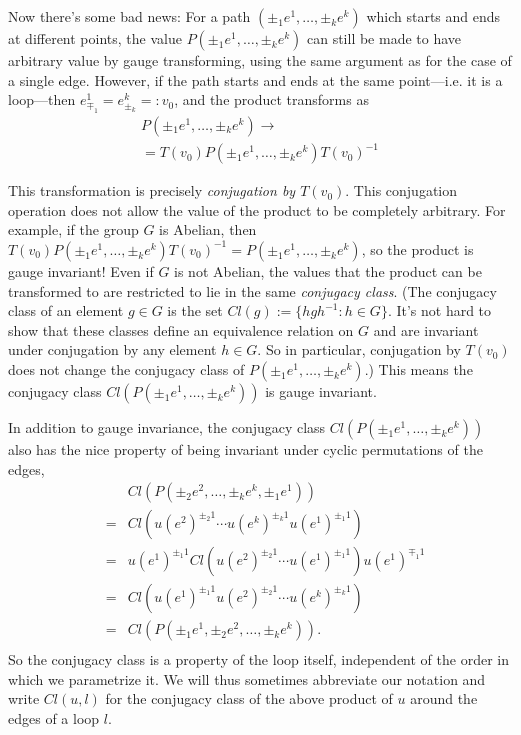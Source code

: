 \documentclass[9pt,twocolumn,twoside]{article}
\begin{document}
Now there's some bad news: For a path $(\pm_1 e^1, \dots , \pm_k e^k)$ which starts and ends at different points, the value $P(\pm_1 e^1, \dots , \pm_k e^k)$ can still be made to have arbitrary value by gauge transforming, using the same argument as for the case of a single edge.  However, if the path starts and ends at the same point---i.e. it is a loop---then $e_{\mp_1}^1 = e_{\pm_k}^k =: v_0$, and the product transforms as 
\begin{multline*}
P(\pm_1 e^1,\dots,\pm_k e^k) \rightarrow \\
= T(v_0) P(\pm_1 e^1,\dots,\pm_k e^k) T(v_0)^{-1}
\end{multline*}

This transformation is precisely \textit{conjugation by $T(v_0)$}.  This conjugation operation does not allow the value of the product to be completely arbitrary.  For example, if the group $G$ is Abelian, then $T(v_0) P(\pm_1 e^1,\dots,\pm_k e^k) T(v_0)^{-1} = P(\pm_1 e^1,\dots,\pm_k e^k)$, so the product is gauge invariant!  Even if $G$ is not Abelian, the values that the product can be transformed to are restricted to lie in the same \textit{conjugacy class}.  (The conjugacy class of an element $g\in G$ is the set $Cl(g):=\{hgh^{-1} : h\in G\}$.  It's not hard to show that these classes define an equivalence relation on $G$ and are invariant under conjugation by any element $h\in G$.  So in particular, conjugation by $T(v_0)$ does not change the conjugacy class of $ P(\pm_1 e^1,\dots,\pm_k e^k)$.)  This means the conjugacy class $Cl( P(\pm_1 e^1,\dots,\pm_k e^k) )$ is gauge invariant. 

In addition to gauge invariance, the conjugacy class $Cl( P(\pm_1 e^1,\dots,\pm_k e^k) )$ also has the nice property of being invariant under cyclic permutations of the edges,
\begin{eqnarray*}
& & Cl\left( P(\pm_2 e^2,\dots,\pm_k e^k,\pm_1 e^1)\right) \\
& = & Cl\left(  u(e^2)^{\pm_2 1} \cdots u(e^k)^{\pm_k 1} u(e^1)^{\pm_1 1} \right) \\
& = & u(e^1)^{\pm_1 1} Cl\left( u(e^2)^{\pm_2 1} \cdots u(e^1)^{\pm_1 1} \right)  u(e^1)^{\mp_1 1} \\
& = & Cl\left(  u(e^1)^{\pm_1 1} u(e^2)^{\pm_2 1} \cdots u(e^k)^{\pm_k 1} \right) \\
& = & Cl\left( P(\pm_1 e^1,\pm_2 e^2,\dots,\pm_k e^k)\right). \\
\end{eqnarray*}
So the conjugacy class is a property of the loop itself, independent of the order in which we parametrize it.  We will thus sometimes abbreviate our notation and write $Cl(u,l)$ for the conjugacy class of the above product of $u$ around the edges of a loop $l$.  
\end{document}
